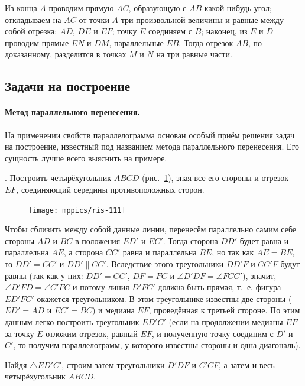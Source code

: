 \documentclass[oneside]{book}
\begin{document}
Из конца $A$ проводим прямую $AC$, образующую с $AB$ какой-нибудь угол;
откладываем на $AC$ от точки $A$ три произвольной величины и равные между собой отрезка:
$AD$, $DE$ и $EF$;
точку $E$ соединяем с $B$;
наконец, из $E$ и $D$ проводим прямые $EN$ и $DM$, параллельные $EB$.
Тогда отрезок $AB$, по доказанному, разделится в точках $M$ и $N$ на три равные части.

\subsection*{Задачи на построение}

{\sloppy 

\paragraph{Метод параллельного перенесения.}\label{1938/101}
На применении свойств параллелограмма основан особый приём решения задач на построение, известный под названием метода параллельного перенесения.
Его сущность лучше всего выяснить на примере.

}

.
Построить четырёхугольник $ABCD$ (рис.~\ref{1938/ris-111}), зная все его стороны и отрезок $EF$, соединяющий середины противоположных сторон.

\begin{figure}
\centering
\texttt{[image: mppics/ris-111]}
\caption{}\label{1938/ris-111}
\end{figure}

Чтобы сблизить между собой данные линии, перенесём параллельно самим себе стороны $AD$ и $BC$ в положения $ED'$ и $EC'$.
Тогда сторона $DD'$ будет равна и параллельна $AE$, а сторона $CC'$ равна и параллельна $BE$, но так как $AE=BE$, то $DD'=CC'$ и $DD'\parallel CC'$.
Вследствие этого треугольники $DD'F$ и $CC'F$ будут равны (так как у них:
$DD' = CC'$, $DF=FC$ и $\angle D'DF=\angle FCC'$), значит, $\angle D'FD=\angle C'FC$ и потому линия $D'FC'$ должна быть прямая, т.~е.
фигура $ED'FC'$ окажется треугольником.
В этом треугольнике известны две стороны ($ED'=AD$ и $EC'=BC$) и медиана $EF$, проведённая к третьей стороне.
По этим данным легко построить треугольник $ED'C'$ (если на продолжении медианы $EF$ за точку $E$ отложим отрезок, равный $EF$, и полученную точку соединим с $D'$ и $C'$, то получим параллелограмм, у которого известны стороны и одна диагональ).

Найдя $\triangle ED'C'$, строим затем треугольники $D'DF$ и $C'CF$, а затем и весь четырёхугольник $ABCD$.
\end{document}
